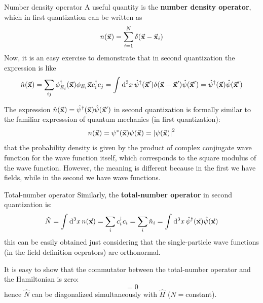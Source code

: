 \documentclass[../main/main.tex]{subfiles}
\begin{document}
\begin{example}{Number density operator}{}
A useful quantity is the \textbf{number density operator}, which in first quantization can be written as
\begin{equation*}
  n (\va{x}) = \sum_{i=1}^{N} \delta (\va{x}- \va{x}_i)
\end{equation*}
Now, it is an easy exercise to demonstrate that in second quantization the expression is like
\begin{equation*}
  \hat{n} (\va{x}) = \sum_{ij}^{} \phi _{E_i} ^\dag  (\va{x}) \phi _{E_i} \va{x} c_i ^\dag c_j =
  \int_{}^{} \dd[3]{x} \hat{\psi } ^\dag (\va{x}') \delta (\va{x}- \va{x}') \hat{\psi } (\va{x}') = \hat{\psi }^\dag (\va{x}) \hat{\psi } (\va{x}')
\end{equation*}

The expression \( \hat{n} (\va{x}) =  \hat{\psi }^\dag (\va{x}) \hat{\psi } (\va{x}')    \)  in second quantization is formally similar to the familiar expresssion of quantum mechanics (in first quantization):
\begin{equation*}
  n (\va{x}) = \psi ^* (\va{x}) \psi (\va{x}) = \abs{\psi (\va{x})} ^2
\end{equation*}
that the probability density is given by the product of complex conjiugate wave function for the wave function itself, which corresponds to the square modulus of the wave function.
However, the meaning is different because in the first we have fields, while in the second we have wave functions.
\end{example}

\begin{example}{Total-number operator}{}
Similarly, the \textbf{total-number operator} in second quantization is:
\begin{equation*}
  \hat{N} = \int_{}^{} \dd[3]{x} n(\va{x})
  = \sum_{i}^{} c_i ^\dag c_i = \sum_{i}^{} \hat{n}_i =
  \int_{}^{} \dd[3]{x} \hat{\psi }^\dag (\va{x}) \hat{\psi }(\va{x})
\end{equation*}
this can be easily obtained just considering that the single-particle wave functions (in the field definition oeprators) are orthonormal.
\end{example}

It is easy to show that the commutator between the total-number operator and the Hamiltonian is zero:
\begin{equation}
  [\hat{N}, \hat{H}  ] = 0
\end{equation}
hence \( \hat{N}  \) can be diagonalized simultaneously with \( \hat{H}  \) (\( N= \)constant).
\end{document}
